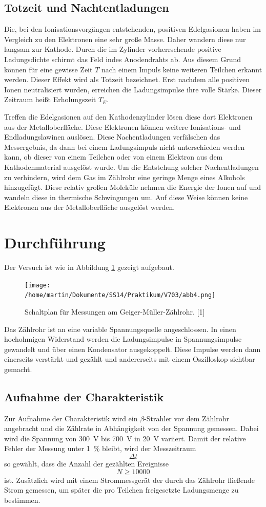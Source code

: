 \documentclass[11pt,ngerman,a4paper]{article}
\begin{document}
\subsection{Totzeit und Nachtentladungen}

Die, bei den Ionisationsvorgängen entstehenden, positiven Edelgasionen haben im Vergleich zu den Elektronen eine sehr große Masse. Daher wandern diese nur langsam zur Kathode. Durch die im Zylinder vorherrschende positive Ladungsdichte schirmt das Feld indes Anodendrahts ab. Aus diesem Grund können für eine gewisse Zeit $T$ nach einem Impuls keine weiteren Teilchen erkannt werden. Dieser Effekt wird als Totzeit bezeichnet. Erst nachdem alle positiven Ionen neutralisiert wurden, erreichen die Ladungsimpulse ihre volle Stärke. Dieser Zeitraum heißt Erholungszeit $T_E$.

\noindent
Treffen die Edelgasionen auf den Kathodenzylinder lösen diese dort Elektronen aus der Metalloberfläche. Diese Elektronen können weitere Ionisations- und Endladungslawinen auslösen. Diese Nachentladungen verfälschen das Messergebnis, da dann bei einem Ladungsimpuls nicht unterschieden werden kann, ob dieser von einem Teilchen oder von einem Elektron aus dem Kathodenmaterial ausgelöst wurde. Um die Entstehung solcher Nachentladungen zu verhindern, wird dem Gas im Zählrohr eine geringe Menge eines Alkohols hinzugefügt. Diese relativ großen Moleküle nehmen die Energie der Ionen auf und wandeln diese in thermische Schwingungen um. Auf diese Weise können keine Elektronen aus der Metalloberfläche ausgelöst werden.
\section{Durchführung}
Der Versuch ist wie in Abbildung \ref{abb4} gezeigt aufgebaut.
\begin{figure}[htp]
\centering
\texttt{[image: /home/martin/Dokumente/SS14/Praktikum/V703/abb4.png]}
\caption{Schaltplan für Messungen am Geiger-Müller-Zählrohr. [1]}
\label{abb4}
\end{figure}
Das Zählrohr ist an eine variable Spannungsquelle angeschlossen. In einen hochohmigen Widerstand werden die Ladungsimpulse in Spannungsimpulse gewandelt und über einen Kondensator ausgekoppelt. Diese Impulse werden dann einerseits verstärkt und gezählt und andererseits mit einem Oszilloskop sichtbar gemacht.
\subsection{Aufnahme der Charakteristik}
Zur Aufnahme der Charakteristik wird ein $\beta$-Strahler vor dem Zählrohr angebracht und die Zählrate in Abhängigkeit von der Spannung gemessen. Dabei wird die Spannung von \SI{300}{\volt} bis \SI{700 }{\volt} in \SI{20}{\volt} variiert. Damit der relative Fehler der Messung unter \SI{1}{\percent} bleibt, wird der Messzeitraum
\[
\Delta t
\]
so gewählt, dass die Anzahl der gezählten Ereignisse
\[
N \geq \num{10000}
\]
ist. Zusätzlich wird mit einem Strommessgerät der durch das Zählrohr fließende Strom gemessen, um später die pro Teilchen freigesetzte Ladungsmenge zu bestimmen. 
\end{document}
